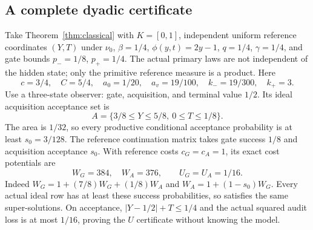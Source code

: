 \subsection*{A complete dyadic certificate}
Take Theorem~\ref{thm:classical} with $K=[0,1]$, independent uniform reference coordinates $(Y,T)$ under $\nu_0$, $\beta=1/4$, $\phi(y,t)=2y-1$, $q=1/4$, $\gamma=1/4$, and gate bounds $p_-=1/8$, $p_+=1/4$. The actual primary laws are not independent of the hidden state; only the primitive reference measure is a product. Here
\[
 c=3/4,\quad C=5/4,\quad a_0=1/20,\quad
 a_v=19/100,\quad k_-=19/300,\quad k_+=3.
\]
Use a three-state observer: gate, acquisition, and terminal value $1/2$. Its ideal acquisition acceptance set is
\[
 A=\{3/8\le Y\le5/8,\ 0\le T\le1/8\}.
\]
The area is $1/32$, so every productive conditional acceptance probability is at least $s_0=3/128$. The reference continuation matrix takes gate success $1/8$ and acquisition acceptance $s_0$. With reference costs $c_G=c_A=1$, its exact cost potentials are
\begin{equation}\label{eq:dyadic-potentials}
 W_G=384,\quad W_A=376,
 \qquad U_G=U_A=1/16.
\end{equation}
Indeed $W_G=1+(7/8)W_G+(1/8)W_A$ and $W_A=1+(1-s_0)W_G$. Every actual ideal row has at least these success probabilities, so satisfies the same super-solutions. On acceptance, $|Y-1/2|+T\le1/4$ and the actual squared audit loss is at most $1/16$, proving the $U$ certificate without knowing the model.

